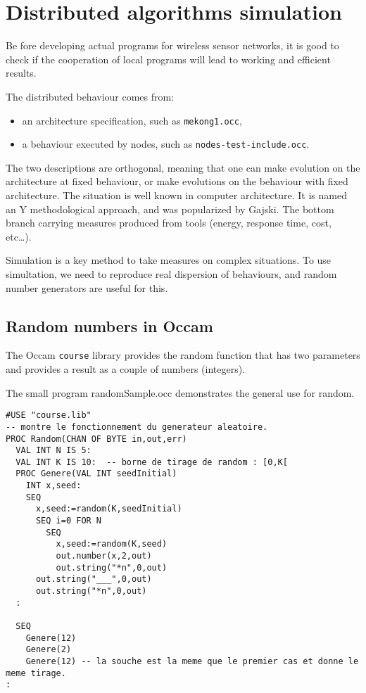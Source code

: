 
\chapter{Distributed algorithms simulation}

Be fore developing actual programs for wireless sensor networks, it
is good to check if the cooperation of local programs will lead
to working and efficient results.

The distributed behaviour comes from:

\begin{itemize}
\item an architecture specification, such as {\tt mekong1.occ},
\item a behaviour executed by nodes, such as {\tt nodes-test-include.occ}.
\end{itemize}

The two descriptions are orthogonal, meaning that one can make
evolution on the architecture at fixed behaviour, or make evolutions on
the behaviour with fixed architecture. The situation is well known
in computer architecture. It is named an Y methodological approach,
and was popularized by Gajski.
The bottom branch carrying measures produced from tools (energy, 
response time, cost, etc\ldots).

Simulation is a key method to take measures on complex situations.
To use simultation, we need to reproduce real dispersion of behaviours,
and random number generators are useful for this.

\section{Random numbers in Occam}

The Occam {\tt course} library provides the random function that
has two parameters and provides a result as a couple of numbers
(integers).

The small program {randomSample.occ}  demonstrates the general use for random.

\begin{lstlisting}  
#USE "course.lib"
-- montre le fonctionnement du generateur aleatoire.
PROC Random(CHAN OF BYTE in,out,err)
  VAL INT N IS 5: 
  VAL INT K IS 10:  -- borne de tirage de random : [0,K[
  PROC Genere(VAL INT seedInitial)
    INT x,seed:
    SEQ
      x,seed:=random(K,seedInitial)
      SEQ i=0 FOR N
        SEQ
          x,seed:=random(K,seed)
          out.number(x,2,out)
          out.string("*n",0,out)
      out.string("___",0,out)
      out.string("*n",0,out)
  :
  
  SEQ
    Genere(12)
    Genere(2)
    Genere(12) -- la souche est la meme que le premier cas et donne le meme tirage.
:
\end{lstlisting}

